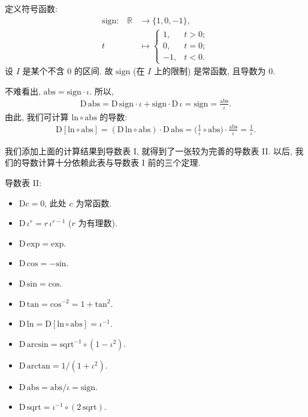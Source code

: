 \begin{example}
    定义符号函数:
    \begin{align*}
        \text{$\mathrm{sign}$:} \quad
        \mathbb{R} & \to \{ 1, 0, -1 \},  \\
        t          & \mapsto \begin{cases}
                                 1,  & t > 0; \\
                                 0,  & t = 0; \\
                                 -1, & t < 0.
                             \end{cases}
    \end{align*}
    设 $I$ 是某个不含 $0$ 的区间. 故 $\mathrm{sign}$ (在 $I$ 上的限制) 是常函数, 且导数为 $0$.

    不难看出, $\mathrm{abs} = \mathrm{sign} \cdot \iota$. 所以,
    \begin{align*}
        \mathrm{D}\, \mathrm{abs} = {\mathrm{D}\, \mathrm{sign}} \cdot \iota + \mathrm{sign} \cdot {\mathrm{D}\, \iota} = \mathrm{sign} = \frac{\mathrm{abs}}{\iota}.
    \end{align*}
    由此, 我们可计算 $\mathrm{ln} \circ \mathrm{abs}$ 的导数:
    \begin{align*}
        \mathrm{D} [\mathrm{ln} \circ \mathrm{abs}] = (\mathrm{D}\, \mathrm{ln} \circ \mathrm{abs}) \cdot \mathrm{D}\, \mathrm{abs} = \bigg(\frac{1}{\iota} \circ \mathrm{abs} \bigg) \cdot \frac{\mathrm{abs}}{\iota} = \frac{1}{\iota}.
    \end{align*}
\end{example}

我们添加上面的计算结果到导数表 I, 就得到了一张较为完善的导数表 II. 以后, 我们的导数计算十分依赖此表与导数表 I 前的三个定理.

\begin{theorem}
    导数表 II:
    \begin{itemize}
        \item $\mathrm{D} c = 0$, 此处 $c$ 为常函数.
        \item $\mathrm{D}\, \iota^r = r \, \iota^{r - 1}$ ($r$ 为有理数).
        \item $\mathrm{D}\, \mathrm{exp} = \mathrm{exp}$.
        \item $\mathrm{D}\, \mathrm{cos} = -\mathrm{sin}$.
        \item $\mathrm{D}\, \mathrm{sin} = \mathrm{cos}$.
        \item $\mathrm{D}\, \mathrm{tan} = \mathrm{cos}^{-2} = 1 + \mathrm{tan}^2$.
        \item $\mathrm{D}\, \mathrm{ln} = \mathrm{D} [\mathrm{ln} \circ \mathrm{abs}] = \iota^{-1}$.
        \item $\mathrm{D}\, \mathrm{arcsin} = \mathrm{sqrt}^{-1} \circ (1 - \iota^2)$.
        \item $\mathrm{D}\, \mathrm{arctan} = 1/(1 + \iota^2)$.
        \item $\mathrm{D}\, \mathrm{abs} = \mathrm{abs}/\iota = \mathrm{sign}$.
        \item $\mathrm{D}\, \mathrm{sqrt} = \iota^{-1} \circ (2\,\mathrm{sqrt})$.
    \end{itemize}
\end{theorem}

